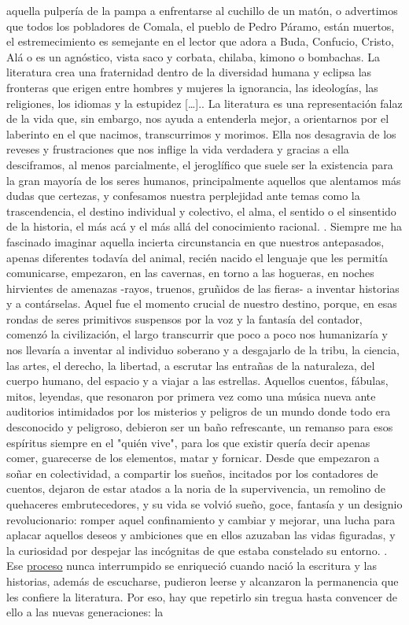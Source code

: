 \documentclass[a4paper,10pt]{article}\usepackage[utf8]{inputenc}\usepackage[spanish]{babel}\usepackage{times}
\begin{document}
aquella pulpería de la pampa a enfrentarse al cuchillo de un matón, o advertimos que todos los pobladores de Comala, el pueblo de Pedro Páramo, están muertos, el estremecimiento es semejante en el lector que adora a Buda, Confucio, Cristo, Alá o es un agnóstico, vista saco y corbata, chilaba, kimono o bombachas. La literatura crea una fraternidad dentro de la diversidad humana y eclipsa las fronteras que erigen entre hombres y mujeres la ignorancia, las ideologías, las religiones, los idiomas y la estupidez […].. La literatura es una representación falaz de la vida que, sin embargo, nos ayuda a entenderla mejor, a orientarnos por el laberinto en el que nacimos, transcurrimos y morimos. Ella nos desagravia de los reveses y frustraciones que nos inflige la vida verdadera y gracias a ella desciframos, al menos parcialmente, el jeroglífico que suele ser la existencia para la gran mayoría de los seres humanos, principalmente aquellos que alentamos más dudas que certezas, y confesamos nuestra perplejidad ante temas como la trascendencia, el destino individual y colectivo, el alma, el sentido o el sinsentido de la historia, el más acá y el más allá del conocimiento racional. . Siempre me ha fascinado imaginar aquella incierta circunstancia en que nuestros antepasados, apenas diferentes todavía del animal, recién nacido el lenguaje que les permitía comunicarse, empezaron, en las cavernas, en torno a las hogueras, en noches hirvientes de amenazas -rayos, truenos, gruñidos de las fieras- a inventar historias y a contárselas. Aquel fue el momento crucial de nuestro destino, porque, en esas rondas de seres primitivos suspensos por la voz y la fantasía del contador, comenzó la civilización, el largo transcurrir que poco a poco nos humanizaría y nos llevaría a inventar al individuo soberano y a desgajarlo de la tribu, la ciencia, las artes, el derecho, la libertad, a escrutar las entrañas de la naturaleza, del cuerpo humano, del espacio y a viajar a las estrellas. Aquellos cuentos, fábulas, mitos, leyendas, que resonaron por primera vez como una música nueva ante auditorios intimidados por los misterios y peligros de un mundo donde todo era desconocido y peligroso, debieron ser un baño refrescante, un remanso para esos espíritus siempre en el "quién vive", para los que existir quería decir apenas comer, guarecerse de los elementos, matar y fornicar. Desde que empezaron a soñar en colectividad, a compartir los sueños, incitados por los contadores de cuentos, dejaron de estar atados a la noria de la supervivencia, un remolino de quehaceres embrutecedores, y su vida se volvió sueño, goce, fantasía y un designio revolucionario: romper aquel confinamiento y cambiar y mejorar, una lucha para aplacar aquellos deseos y ambiciones que en ellos azuzaban las vidas figuradas, y la curiosidad por despejar las incógnitas de que estaba constelado su entorno. . Ese \underline{ proceso} nunca interrumpido se enriqueció cuando nació la escritura y las historias, además de escucharse, pudieron leerse y alcanzaron la permanencia que les confiere la literatura. Por eso, hay que repetirlo sin tregua hasta convencer de ello a las nuevas generaciones: la 
\end{document}
